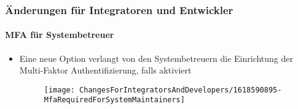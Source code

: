 %

\begin{frame}[fragile]
	\frametitle{Änderungen für Integratoren und Entwickler}
	\framesubtitle{MFA für Systembetreuer}


	\begin{itemize}
		\item Eine neue Option verlangt von den Systembetreuern die Einrichtung der Multi-Faktor
			Authentifizierung, falls aktiviert
		\vspace{0.4cm}
		\begin{figure}
			\texttt{[image: ChangesForIntegratorsAndDevelopers/1618590895-MfaRequiredForSystemMaintainers]}
		\end{figure}
	\end{itemize}
\end{frame}

